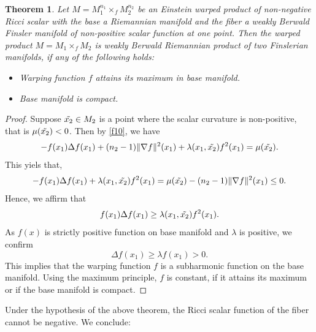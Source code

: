 \documentclass[pdflatex,sn-mathphys-num]{sn-jnl}%
\theoremstyle{thmstyleone}%
\newtheorem{theorem}{Theorem}%
\theoremstyle{thmstyletwo}%
\theoremstyle{thmstylethree}%
\begin{document}
\vspace{0.15in}

\begin{theorem}
	Let $M=M_1^{n_1}\times_{f} M_2^{n_2}$ be an Einstein warped product of non-negative Ricci scalar  with the base a Riemannian manifold and the fiber a weakly Berwald Finsler manifold of  non-positive  scalar function at one point. Then the warped product $M=M_1\times_f M_2$ is weakly Berwald  Riemannian product of two 
 Finslerian manifolds, if any of the following holds:
	\begin{itemize}
		\item[\emph{(i)}] Warping function $f$ attains its maximum in base manifold.
		\item[\emph{(ii)}] Base manifold is compact.
	\end{itemize}
\end{theorem}

\begin{proof}
	Suppose $\Tilde{x_2} \in M_2$ is a point where the scalar curvature is non-positive, that is $\mu(\Tilde{x_2})<0$. Then by \eqref{f10}, we have  \newline
	\begin{equation*}
		-f(x_1)\Delta f(x_1) +(n_2-1)\|\nabla f\|^2(x_1)+\lambda (x_1,\Tilde{x_2}) f^2(x_1)=\mu(\Tilde{x_2}).
	\end{equation*}
	This yiels that,
	\begin{equation*}
		-f(x_1)\Delta f(x_1) +\lambda (x_1,\Tilde{x_2}) f^2(x_1)=\mu(\Tilde{x_2})-(n_2-1)\|\nabla f\|^2(x_1)\leq 0.
	\end{equation*}
	Hence, we affirm that
	\begin{equation*}
		f(x_1)\Delta f(x_1) \geq \lambda(x_1,\Tilde{x_2})f^2(x_1). 
	\end{equation*}		
As $f(x)$ is strictly positive function on base manifold and $\lambda$ is positive, we confirm
	\begin{equation*}
		\Delta f(x_1) \geq \lambda f(x_1) > 0.
	\end{equation*}
	This implies that the warping function 
$f$ is a subharmonic function on the base manifold. Using the maximum principle, $f$ is constant, if it attains its maximum or if the base manifold is compact.
\end{proof}

\bigskip
Under the hypothesis of the above theorem, the Ricci scalar function of the fiber cannot be negative.
We conclude:

\vspace{0.15in}
\end{document}

